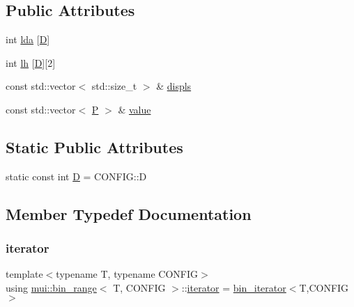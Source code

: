 \subsection*{Public Attributes}
\begin{DoxyCompactItemize}
\item 
int \hyperlink{structmui_1_1bin__range_a78d3c699b3a7844bcf57007f6133eabf}{lda} \mbox{[}\hyperlink{structmui_1_1bin__range_a808a42cd40f43cf33068640f6b86bf27}{D}\mbox{]}
\item 
int \hyperlink{structmui_1_1bin__range_a5bb17a3c008ee08377fb19edefec8227}{lh} \mbox{[}\hyperlink{structmui_1_1bin__range_a808a42cd40f43cf33068640f6b86bf27}{D}\mbox{]}\mbox{[}2\mbox{]}
\item 
const std\+::vector$<$ std\+::size\+\_\+t $>$ \& \hyperlink{structmui_1_1bin__range_a03f6cc1480f9233acea769dc0bfe26e9}{displs}
\item 
const std\+::vector$<$ \hyperlink{structmui_1_1bin__range_af4a922fdb02454e89adce8ea9bb21f35}{P} $>$ \& \hyperlink{structmui_1_1bin__range_aaebd096de3e37d0c13fd27722d3fbb5e}{value}
\end{DoxyCompactItemize}
\subsection*{Static Public Attributes}
\begin{DoxyCompactItemize}
\item 
static const int \hyperlink{structmui_1_1bin__range_a808a42cd40f43cf33068640f6b86bf27}{D} = C\+O\+N\+F\+I\+G\+::D
\end{DoxyCompactItemize}


\subsection{Member Typedef Documentation}
\mbox{\label{structmui_1_1bin__range_ad39d02903689c0911cffe91dc8634297}} 
\subsubsection{\texorpdfstring{iterator}{iterator}}
{\footnotesize\ttfamily template$<$typename T, typename C\+O\+N\+F\+IG$>$ \\
using \hyperlink{structmui_1_1bin__range}{mui\+::bin\+\_\+range}$<$ T, C\+O\+N\+F\+IG $>$\+::\hyperlink{structmui_1_1bin__range_ad39d02903689c0911cffe91dc8634297}{iterator} =  \hyperlink{structmui_1_1bin__iterator}{bin\+\_\+iterator}$<$T,C\+O\+N\+F\+IG$>$}

